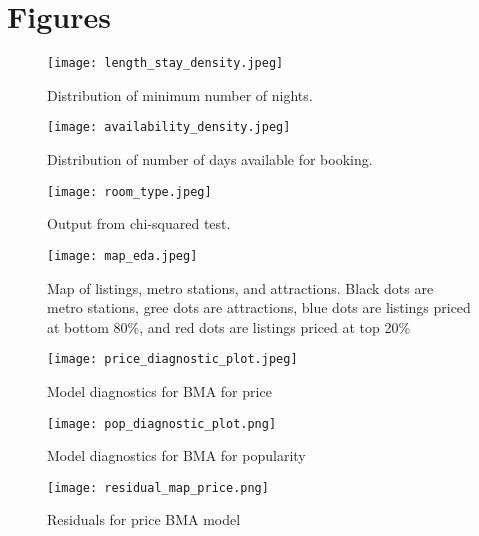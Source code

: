 \documentclass[10pt]{jmlr}%
\begin{document}
\newpage
\appendix

\section{Figures}
\label{appendix:fig}

\begin{figure}[htbp]
	\centering
	\caption{Distribution of minimum number of nights.}
	\texttt{[image: length\_stay\_density.jpeg]}
	\label{fig:length_stay_density}
\end{figure}

\begin{figure}[htbp]
	\centering
	\caption{Distribution of number of days available for booking.}
	\texttt{[image: availability\_density.jpeg]}
	\label{fig:availability_density}
\end{figure}

\begin{figure}[htbp]
	\centering
	\caption{Output from chi-squared test.}
	\texttt{[image: room\_type.jpeg]}
	\label{fig:room_type}
\end{figure}

\begin{figure}[htbp]
	\centering
	\caption{Map of listings, metro stations, and attractions. Black dots are metro stations, gree dots are attractions, blue dots are listings priced at bottom 80\%, and red dots are listings priced at top 20\%}
	\texttt{[image: map\_eda.jpeg]}
	\label{fig:map_eda}
\end{figure}

\begin{figure}[htbp]
	\centering
	\caption{Model diagnostics for BMA for price}
	\texttt{[image: price\_diagnostic\_plot.jpeg]}
	\label{fig:price_diag}
\end{figure}

\begin{figure}[htbp]
	\centering
	\caption{Model diagnostics for BMA for popularity}
	\texttt{[image: pop\_diagnostic\_plot.png]}
	\label{fig:pop_diag}
\end{figure}

\begin{figure}[htbp]
	\centering
	\caption{Residuals for price BMA model}
	\texttt{[image: residual\_map\_price.png]}
	\label{fig:map_residuals}
\end{figure}
\end{document}
